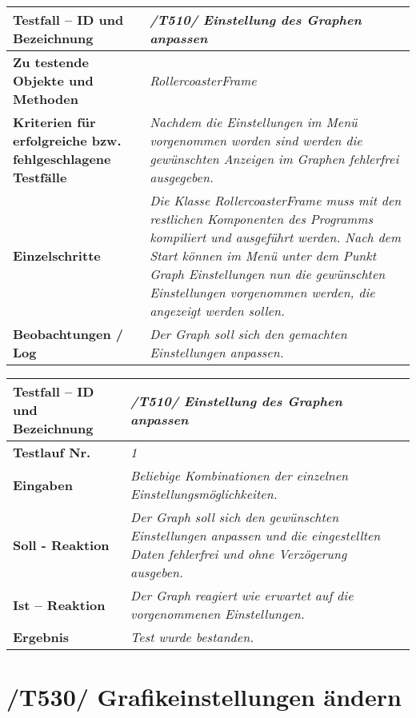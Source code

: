 \begin{longtable}{|p{7cm}|p{10cm}|}
\hline
\textbf{Testfall -- ID und Bezeichnung} &  \textit{/T510/ Einstellung des Graphen anpassen} \\
\hline
\textbf{Zu testende Objekte und Methoden} &  \textit{RollercoasterFrame}
\\
\hline
\textbf{Kriterien für erfolgreiche bzw. fehlgeschlagene Testfälle} &
\textit{Nachdem die Einstellungen im Menü vorgenommen worden sind werden die gewünschten Anzeigen im Graphen fehlerfrei ausgegeben. } \\
\hline
\textbf{Einzelschritte} &  \textit{Die Klasse RollercoasterFrame muss mit den restlichen Komponenten des Programms kompiliert und ausgeführt werden. Nach dem Start können im Menü unter dem Punkt
Graph Einstellungen nun die gewünschten Einstellungen vorgenommen werden, die angezeigt werden sollen.} \\
\hline
\textbf{Beobachtungen / Log} &  \textit{Der Graph soll sich den gemachten Einstellungen anpassen.} \\
\hline
\end{longtable}

\begin{longtable}{|p{7cm}|p{10cm}|}
\hline
\textbf{Testfall -- ID und Bezeichnung} & \textit{ /T510/ Einstellung des Graphen anpassen} \\
\hline
\textbf{Testlauf Nr.} & \textit{1} \\
\hline
\textbf{Eingaben} & \textit{Beliebige Kombinationen der einzelnen Einstellungsmöglichkeiten.} \\
\hline
\textbf{Soll - Reaktion} & \textit{Der Graph soll sich den gewünschten Einstellungen anpassen und die eingestellten Daten fehlerfrei und ohne Verzögerung ausgeben.} \\
\hline
\textbf{Ist -- Reaktion} & \textit{Der Graph reagiert wie erwartet auf die vorgenommenen Einstellungen.} \\
\hline
\textbf{Ergebnis} & \textit{Test wurde bestanden.} \\
\hline
\end{longtable}

\section{/T530/ Grafikeinstellungen ändern}

